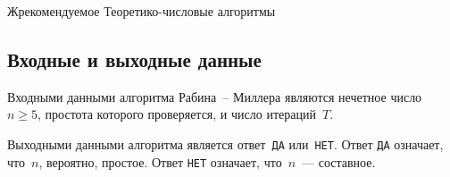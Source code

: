 \begin{appendix}{Ж}{рекомендуемое}
{Теоретико-числовые алгоритмы}\label{NT}

%
%
%
%
%
%
%

\label{NT.PrimeQ}

\subsection{Входные и выходные данные}\label{NT.PrimeQ.InOut}

Входными данными алгоритма Рабина~-- Миллера
являются нечетное число~$n\geq 5$,
простота которого проверяется, и число итераций~$T$.

Выходными данными алгоритма является ответ~\texttt{ДА} или~\texttt{НЕТ}.
Ответ \texttt{ДА} означает, что~$n$, вероятно, простое.
Ответ \texttt{НЕТ} означает, что~$n$~--- составное.


\end{appendix}
